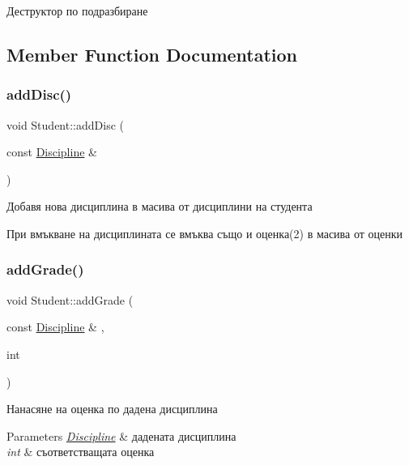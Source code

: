 Деструктор по подразбиране 



\subsection{Member Function Documentation}
\mbox{\label{class_student_a3cffc2aef59a99f5c0441f1bc73b090f}} 
\subsubsection{\texorpdfstring{add\+Disc()}{addDisc()}}
{\footnotesize\ttfamily void Student\+::add\+Disc (\begin{DoxyParamCaption}\item[{const \hyperlink{class_discipline}{Discipline} \&}]{ }\end{DoxyParamCaption})}



Добавя нова дисциплина в масива от дисциплини на студента 

При вмъкване на дисциплината се вмъква също и оценка(2) в масива от оценки \mbox{\label{class_student_ab5a5f93a5d48e7904413de356eb89811}} 
\subsubsection{\texorpdfstring{add\+Grade()}{addGrade()}}
{\footnotesize\ttfamily void Student\+::add\+Grade (\begin{DoxyParamCaption}\item[{const \hyperlink{class_discipline}{Discipline} \&}]{,  }\item[{int}]{ }\end{DoxyParamCaption})}



Нанасяне на оценка по дадена дисциплина 


\begin{DoxyParams}{Parameters}
{\em \hyperlink{class_discipline}{Discipline}} & дадената дисциплина \\
\hline
{\em int} & съответстващата оценка \\
\hline
\end{DoxyParams}
\mbox{\label{class_student_a082a64426f8133e4e176adb50ac0b477}} 
